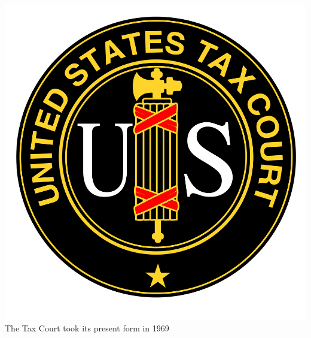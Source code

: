 \begin{frame}
    \centering
    \includegraphics[height=.8\textheight]{img/fasces/tax-court.png} \\
    The Tax Court took its present form in 1969 \\
\end{frame}

